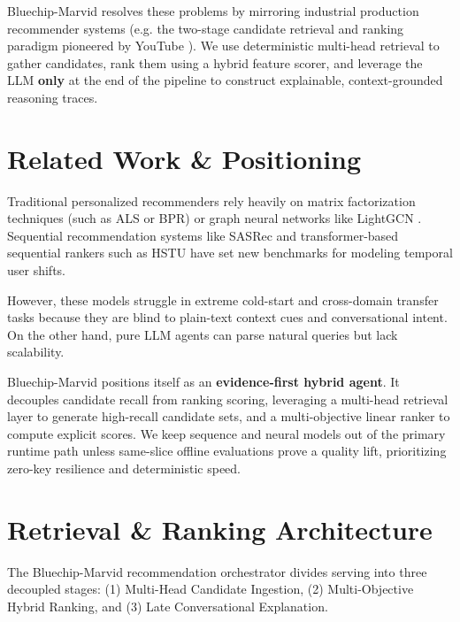 \documentclass[11pt,a4paper]{article}
\begin{document}
Bluechip-Marvid resolves these problems by mirroring industrial production recommender systems (e.g. the two-stage candidate retrieval and ranking paradigm pioneered by YouTube \cite{covington2016}). We use deterministic multi-head retrieval to gather candidates, rank them using a hybrid feature scorer, and leverage the LLM \textbf{only} at the end of the pipeline to construct explainable, context-grounded reasoning traces.

\section{Related Work \& Positioning}
Traditional personalized recommenders rely heavily on matrix factorization techniques (such as ALS or BPR) or graph neural networks like LightGCN \cite{he2020}. Sequential recommendation systems like SASRec \cite{kang2018} and transformer-based sequential rankers such as HSTU \cite{hstu} have set new benchmarks for modeling temporal user shifts.

However, these models struggle in extreme cold-start and cross-domain transfer tasks because they are blind to plain-text context cues and conversational intent. On the other hand, pure LLM agents can parse natural queries but lack scalability.

Bluechip-Marvid positions itself as an \textbf{evidence-first hybrid agent}. It decouples candidate recall from ranking scoring, leveraging a multi-head retrieval layer to generate high-recall candidate sets, and a multi-objective linear ranker to compute explicit scores. We keep sequence and neural models out of the primary runtime path unless same-slice offline evaluations prove a quality lift, prioritizing zero-key resilience and deterministic speed.

\section{Retrieval \& Ranking Architecture}
The Bluechip-Marvid recommendation orchestrator divides serving into three decoupled stages: (1) Multi-Head Candidate Ingestion, (2) Multi-Objective Hybrid Ranking, and (3) Late Conversational Explanation.
\end{document}

